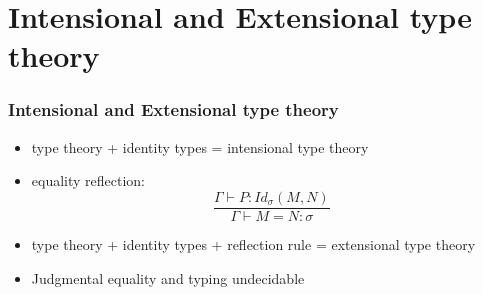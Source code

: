 \documentclass[aspectratio=169]{beamer}
\newcommand{\Id}[2]{Id_\sigma(#1,#2)}
\begin{document}
    \section{Intensional and Extensional type theory}
    \begin{frame}
        \frametitle{Intensional and Extensional type theory}
        \begin{itemize}
            \item type theory + identity types = intensional type theory
            \item equality reflection:
            $$\frac{\Gamma \vdash P: \Id{M}{N}}{\Gamma \vdash M = N : \sigma}$$
            \item type theory + identity types + reflection rule = extensional type theory
            \item Judgmental equality and typing undecidable
        \end{itemize}
    \end{frame}
\end{document}
